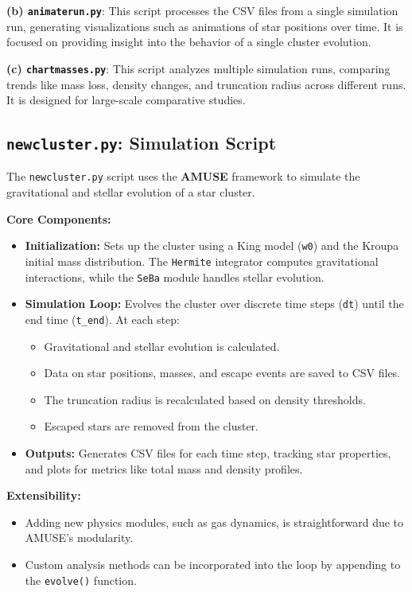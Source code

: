 \documentclass[10pt,twocolumn]{article}
\begin{document}
\textbf{(b) \texttt{animaterun.py}}: This script processes the CSV files from a single simulation run, generating visualizations such as animations of star positions over time. It is focused on providing insight into the behavior of a single cluster evolution.

\textbf{(c) \texttt{chartmasses.py}}: This script analyzes multiple simulation runs, comparing trends like mass loss, density changes, and truncation radius across different runs. It is designed for large-scale comparative studies.

\subsection{\texttt{newcluster.py}: Simulation Script}
The \texttt{newcluster.py} script uses the \textbf{AMUSE} framework to simulate the gravitational and stellar evolution of a star cluster. 

\textbf{Core Components:}
\begin{itemize}
    \item \textbf{Initialization:} Sets up the cluster using a King model (\texttt{w0}) and the Kroupa initial mass distribution. The \texttt{Hermite} integrator computes gravitational interactions, while the \texttt{SeBa} module handles stellar evolution.
    \item \textbf{Simulation Loop:} Evolves the cluster over discrete time steps (\texttt{dt}) until the end time (\texttt{t\_end}). At each step:
    \begin{itemize}
        \item Gravitational and stellar evolution is calculated.
        \item Data on star positions, masses, and escape events are saved to CSV files.
        \item The truncation radius is recalculated based on density thresholds.
        \item Escaped stars are removed from the cluster.
    \end{itemize}
    \item \textbf{Outputs:} Generates CSV files for each time step, tracking star properties, and plots for metrics like total mass and density profiles.
\end{itemize}

\textbf{Extensibility:} 
\begin{itemize}
    \item Adding new physics modules, such as gas dynamics, is straightforward due to AMUSE’s modularity.
    \item Custom analysis methods can be incorporated into the loop by appending to the \texttt{evolve()} function.
\end{itemize}
\end{document}
